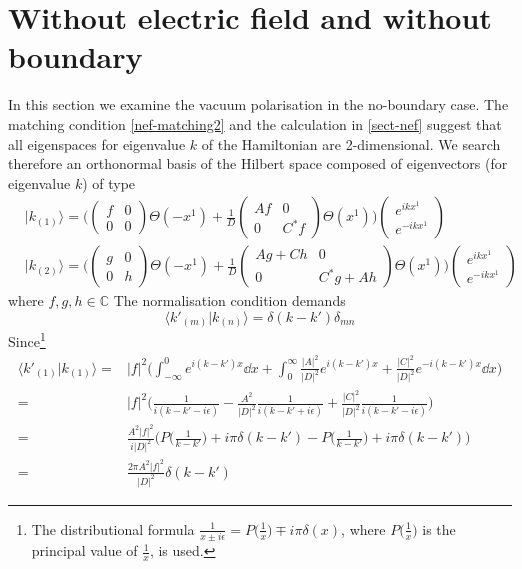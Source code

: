 \section{Without electric field and without boundary}\label{sect-nbnef}
In this section we examine the vacuum polarisation in the no-boundary case.
The matching condition \cref{nef-matching2} and the calculation in \cref{sect-nef} suggest that all eigenspaces for eigenvalue $k$ of the Hamiltonian are 2-dimensional. We search therefore an orthonormal basis of the Hilbert space composed of eigenvectors (for eigenvalue $k$) of type
\begin{equation}
\begin{split}
& | k_{(1)} \rangle = \bigg( \begin{pmatrix} f & 0 \\ 0 & 0 \end{pmatrix}
\Theta(-x^1) + 
\frac{1}{D}\begin{pmatrix} Af & 0 \\  0 & C^* f \end{pmatrix} \Theta(x^1) \bigg)
\begin{pmatrix} e^{ikx^1}  \\ e^{-ikx^1} \end{pmatrix}   \\
& | k_{(2)} \rangle = \bigg( \begin{pmatrix} g& 0 \\ 0 & h \end{pmatrix}
\Theta(-x^1) + 
\frac{1}{D}\begin{pmatrix} Ag + Ch  & 0\\ 0&  C^*g + Ah  \end{pmatrix} \Theta(x^1) \bigg)
\begin{pmatrix} e^{ikx^1}  \\  e^{-ikx^1}  \end{pmatrix}  
\end{split}
\end{equation}
where $f,g,h \in \mathbb{C}$
The normalisation condition demands
\begin{equation}
\langle k'_{(m)} | k_{(n)} \rangle = \delta(k - k') \delta_{mn}
\end{equation}
Since\footnote{
The distributional formula $\frac{1}{x \pm i\epsilon} = P\big(\frac{1}{x}\big) \mp i\pi\delta(x)$, where $P\big(\frac{1}{x}\big)$ is the principal value of $\frac{1}{x}$, is used.}
\begin{equation}
\begin{split}
\langle k'_{(1)} | k_{(1)} \rangle = & |f|^2 \bigg( \int_{-\infty}^0 e^{i(k - k')x} \dd x + \int_0^{\infty}\frac{|A|^2}{|D|^2} e^{i(k-k')x} + \frac{|C|^2}{|D|^2} e^{-i(k - k')x} \dd x \bigg) \\
= & |f|^2 \bigg( \frac{1}{i(k-k' - i\epsilon)} - \frac{A^2}{|D|^2}\frac{1}{i(k-k'+i\epsilon)} + \frac{|C|^2}{|D|^2}\frac{1}{i(k-k'-i\epsilon)} \bigg) \\
= & \frac{A^2 |f|^2}{i |D|^2}\Big( P\big(\frac{1}{k-k'}\big) + i\pi \delta(k-k') - P\big(\frac{1}{k-k'}\big) + i\pi \delta(k-k') \Big) \\
= & \frac{2\pi A^2 |f|^2}{|D|^2} \delta(k-k')
\end{split}
\end{equation}
